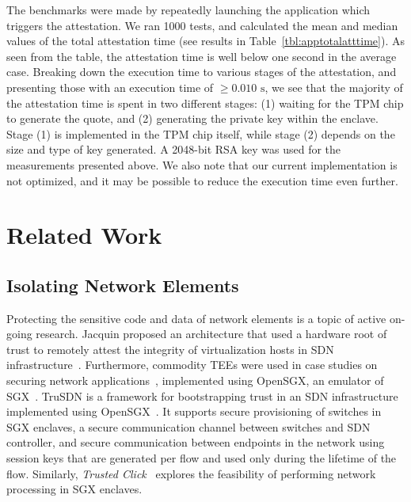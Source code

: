 {The benchmarks were made by repeatedly launching the application which triggers the attestation. 
We ran 1000 tests, and calculated the mean and median values of the total attestation time (see results in Table~\ref{tbl:apptotalatttime}).
As seen from the table, the attestation time is well below one second in the average case.
Breaking down the execution time to various stages of the attestation, and presenting those with an execution time of $\ge 0.010 \text{ s}$, we see that the majority of the attestation time is spent in two different stages: (1) waiting for the TPM chip to generate the quote, and (2) generating the private key within the enclave. 
Stage (1) is implemented in the TPM chip itself, while stage (2) depends on the size and type of key generated. A 2048-bit RSA key was used for the measurements presented above.
We also note that our current implementation is not optimized, and it may be possible to reduce the execution time even further.


\section{Related Work}
\label{sec:related-work}

\subsection{Isolating Network Elements}
\label{subsec:effective-network-element-isolation}
Protecting the sensitive code and data of network elements is a topic of active on-going research.
Jacquin proposed an architecture that used a hardware root of trust to remotely attest the integrity of virtualization hosts in SDN infrastructure~\cite{jacquin:2015}.
Furthermore, commodity TEEs were used in case studies on securing network applications~\cite{kim:2015,shih:2016}, implemented using OpenSGX, an emulator of SGX~\cite{jain:2016}.
TruSDN is a framework for bootstrapping trust in an SDN infrastructure implemented using OpenSGX~\cite{paladi:2016b}.
It supports secure provisioning of switches in SGX enclaves, a secure communication channel between switches and SDN controller, and secure communication between endpoints in the network using session keys that are generated per flow and used only during the lifetime of the flow.
Similarly, \textit{Trusted Click}~\cite{coughlin:2017} explores the feasibility of performing network processing in SGX enclaves.

}
